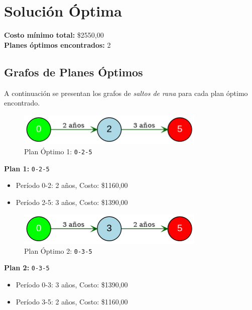 \documentclass[12pt]{article}
\begin{document}
\clearpage
\section*{Solución Óptima}
\textbf{Costo mínimo total:} \$2550,00\\
\textbf{Planes óptimos encontrados:} 2
\subsection*{Grafos de Planes Óptimos}
A continuación se presentan los grafos de \emph{saltos de rana} para cada plan óptimo encontrado.

\begin{figure}[H]
\centering
\includegraphics[width=0.8\textwidth]{Remplazo1_plan_1.png}
\caption{Plan Óptimo 1: \texttt{0-2-5}}
\label{fig:plan1}
\end{figure}

\textbf{Plan 1:} \texttt{0-2-5}
\begin{itemize}\small
\item Período 0-2: 2 años, Costo: \$1160,00
\item Período 2-5: 3 años, Costo: \$1390,00
\end{itemize}

\begin{figure}[H]
\centering
\includegraphics[width=0.8\textwidth]{Remplazo1_plan_2.png}
\caption{Plan Óptimo 2: \texttt{0-3-5}}
\label{fig:plan2}
\end{figure}

\textbf{Plan 2:} \texttt{0-3-5}
\begin{itemize}\small
\item Período 0-3: 3 años, Costo: \$1390,00
\item Período 3-5: 2 años, Costo: \$1160,00
\end{itemize}
\end{document}
